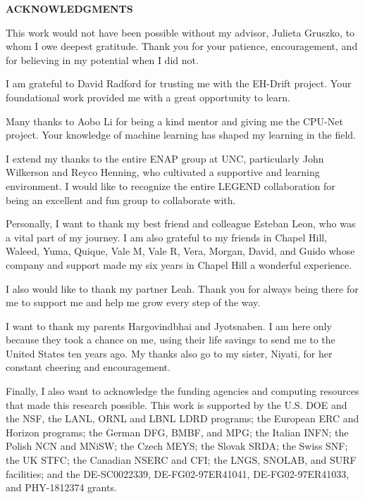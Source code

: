 \begin{center}
\vspace*{52pt}
{\normalfont \textbf{ACKNOWLEDGMENTS}}
\end{center}

This work would not have been possible without my advisor, Julieta Gruszko, to whom I owe deepest gratitude. Thank you for your patience, encouragement, and for believing in my potential when I did not.

I am grateful to David Radford for trusting me with the EH-Drift project. Your foundational work provided me with a great opportunity to learn.

Many thanks to Aobo Li for being a kind mentor and giving me the CPU-Net project. Your knowledge of machine learning has shaped my learning in the field.

I extend my thanks to the entire ENAP group at UNC, particularly John Wilkerson and Reyco Henning, who cultivated a supportive and learning environment. I would like to recognize the entire LEGEND collaboration for being an excellent and fun group to collaborate with. 

Personally, I want to thank my best friend and colleague Esteban Leon, who was a vital part of my journey. I am also grateful to my friends in Chapel Hill, Waleed, Yuma, Quique, Vale M, Vale R, Vera, Morgan, David, and Guido whose company and support made my six years in Chapel Hill a wonderful experience.

I also would like to thank my partner Leah. Thank you for always being there for me to support me and help me grow every step of the way.

I want to thank my parents Hargovindbhai and Jyotsnaben. I am here only because they took a chance on me, using their life savings to send me to the United States ten years ago. My thanks also go to my sister, Niyati, for her constant cheering and encouragement.

Finally, I also want to acknowledge the funding agencies and computing resources that made this research possible. This work is supported by the U.S. DOE and the NSF, the LANL, ORNL and LBNL LDRD programs; the European ERC and Horizon programs; the German DFG, BMBF, and MPG; the Italian INFN; the Polish NCN and MNiSW; the Czech MEYS; the Slovak SRDA; the Swiss SNF; the UK STFC; the Canadian NSERC and CFI; the LNGS, SNOLAB, and SURF facilities; and the DE-SC0022339, DE-FG02-97ER41041, DE-FG02-97ER41033, and PHY-1812374 grants.

\clearpage